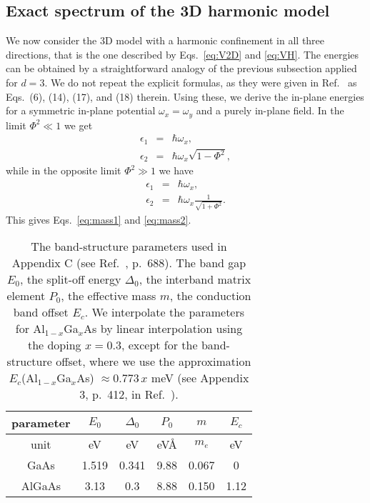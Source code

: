 \documentclass[aps,floatfix,twocolumn,showpacs,10pt,nofootinbib]{revtex4-1}
\begin{document}
\subsection{Exact spectrum of the 3D harmonic model}


We now consider the 3D model with a harmonic confinement in all three directions, that is the one described by Eqs.~\eqref{eq:V2D} and \eqref{eq:VH}. The energies can be obtained by a straightforward analogy of the previous subsection applied for $d=3$. We do not repeat the explicit formulas, as they were given in Ref.~ as Eqs.~(6), (14), (17), and (18) therein. Using these, we derive the in-plane energies for a symmetric in-plane potential $\omega_x = \omega_y$ and a purely in-plane field. In the limit $\Phi^2 \ll 1$ we get
\begin{subequations}
\begin{eqnarray}
\epsilon_1 &=& \hbar \omega_x ,\\
\epsilon_2 &=& \hbar \omega_x \sqrt{1-\Phi^2},
\end{eqnarray}
\end{subequations}
while in the opposite limit $\Phi^2 \gg 1$ we have
\begin{subequations}
\begin{eqnarray}
\epsilon_1 &=& \hbar \omega_x ,\\
\epsilon_2 &=& \hbar \omega_x \frac{1}{\sqrt{1+\Phi^2}}.
\end{eqnarray}
\end{subequations}
This gives Eqs.~\eqref{eq:mass1} and \eqref{eq:mass2}.


\begin{table}
\begin{tabular}{cccccc}
\hline \hline
parameter & $E_0$  & $\Delta_0$ & $P_0$ & $m$ & $E_c$\\
\hline
unit & eV & eV& eV\AA& $m_e$ & eV\\
\hline
GaAs & 1.519 & 0.341 & 9.88 & 0.067 & 0\\
AlGaAs & 3.13 & 0.3 & 8.88 & 0.150& 1.12\\
\hline \hline
\end{tabular}
\caption{\label{tab:parameters}
The band-structure parameters used in Appendix C (see Ref.~, p.~688). The band gap $E_0$, the split-off energy $\Delta_0$, the interband matrix element $P_0$, the effective mass $m$, the conduction band offset $E_c$.
We interpolate the parameters for Al$_{1-x}$Ga$_x$As by linear interpolation using the doping $x=0.3$, except for the band-structure offset, where we use the approximation $E_c$(Al$_{1-x}$Ga$_x$As) $ \approx 0.773\, x$ meV (see Appendix 3, p.~412, in Ref.~).
}
\end{table}
\end{document}
